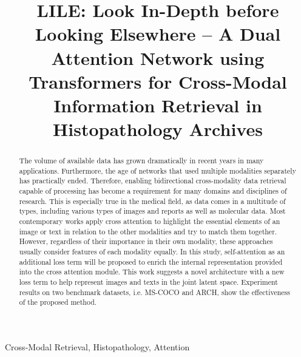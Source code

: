 \documentclass{midl}
\title[LILE]{LILE: Look In-Depth before Looking Elsewhere -- A Dual Attention Network using Transformers for Cross-Modal Information Retrieval in Histopathology Archives}
\begin{document}
\maketitle

\begin{abstract}
The volume of available data has grown dramatically in recent years in many applications. Furthermore, the age of networks that used multiple modalities separately has practically ended. Therefore, enabling bidirectional cross-modality data retrieval capable of processing has become a requirement for many domains and disciplines of research. This is especially true in the medical field, as data comes in a multitude of types, including various types of images and reports as well as molecular data.
Most contemporary works apply cross attention to highlight the essential elements of an image or text in relation to the other modalities and try to match them together. However, regardless of their importance in their own modality, these approaches usually consider features of each modality equally. In this study, self-attention as an additional loss term will be proposed to enrich the internal representation provided into the cross attention module.  
This work suggests a novel architecture with a new loss term to help represent images and texts in the joint latent space. Experiment results on two benchmark datasets, i.e. MS-COCO and ARCH, show the effectiveness of the proposed method.
\end{abstract}

\begin{keywords}
Cross-Modal Retrieval, Histopathology, Attention
\end{keywords}
\end{document}
